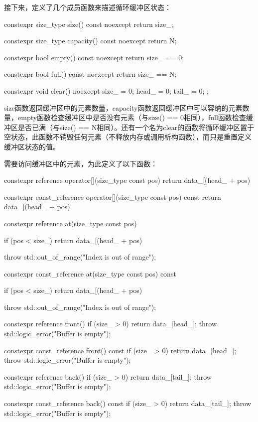 接下来，定义了几个成员函数来描述循环缓冲区状态：

\begin{cpp}
constexpr size_type size() const noexcept
{ return size_; }

constexpr size_type capacity() const noexcept
{ return N; }

constexpr bool empty() const noexcept
{ return size_ == 0; }

constexpr bool full() const noexcept
{ return size_ == N; }

constexpr void clear() noexcept
{ size_ = 0; head_ = 0; tail_ = 0; };
\end{cpp}

size函数返回缓冲区中的元素数量，capacity函数返回缓冲区中可以容纳的元素数量，empty函数检查缓冲区中是否没有元素（与size() == 0相同），full函数检查缓冲区是否已满（与size() == N相同）。还有一个名为clear的函数将循环缓冲区置于空状态，此函数不销毁任何元素（不释放内存或调用析构函数），而只是重置定义缓冲区状态的值。

需要访问缓冲区中的元素，为此定义了以下函数：

\begin{cpp}
constexpr reference operator[](size_type const pos)
{
	return data_[(head_ + pos) %
}

constexpr const_reference operator[](size_type const pos) const
{
	return data_[(head_ + pos) %
}

constexpr reference at(size_type const pos)
{
	if (pos < size_)
		return data_[(head_ + pos) %
		
	throw std::out_of_range("Index is out of range");
}

constexpr const_reference at(size_type const pos) const
{
	if (pos < size_)
		return data_[(head_ + pos) %
		
	throw std::out_of_range("Index is out of range");
}

constexpr reference front()
{
	if (size_ > 0) return data_[head_];
	throw std::logic_error("Buffer is empty");
}

constexpr const_reference front() const
{
	if (size_ > 0) return data_[head_];
	throw std::logic_error("Buffer is empty");
}

constexpr reference back()
{
	if (size_ > 0) return data_[tail_];
	throw std::logic_error("Buffer is empty");
}

constexpr const_reference back() const
{
	if (size_ > 0) return data_[tail_];
	throw std::logic_error("Buffer is empty");
}
\end{cpp}

